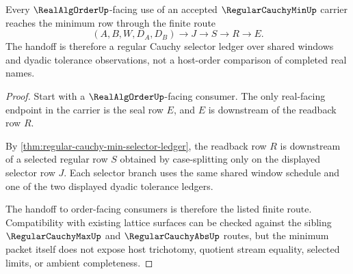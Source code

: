 \begin{theorem}
\label{thm:regular-cauchy-min-realalgorder-handoff}
Every $\RealAlgOrderUp$-facing use of an accepted $\RegularCauchyMinUp$ carrier reaches the minimum row through the finite route
$$
(A,B,W,D_A,D_B)
\longrightarrow
J
\longrightarrow
S
\longrightarrow
R
\longrightarrow
E .
$$
The handoff is therefore a regular Cauchy selector ledger over shared windows and dyadic tolerance observations, not a host-order comparison of completed real names.
\end{theorem}
\begin{proof}
Start with a $\RealAlgOrderUp$-facing consumer. The only real-facing endpoint in the carrier is the seal row $E$, and $E$ is downstream of the readback row $R$.

By \autoref{thm:regular-cauchy-min-selector-ledger}, the readback row $R$ is downstream of a selected regular row $S$ obtained by case-splitting only on the displayed selector row $J$. Each selector branch uses the same shared window schedule and one of the two displayed dyadic tolerance ledgers.

The handoff to order-facing consumers is therefore the listed finite route. Compatibility with existing lattice surfaces can be checked against the sibling $\RegularCauchyMaxUp$ and $\RegularCauchyAbsUp$ routes, but the minimum packet itself does not expose host trichotomy, quotient stream equality, selected limits, or ambient completeness.
\end{proof}

